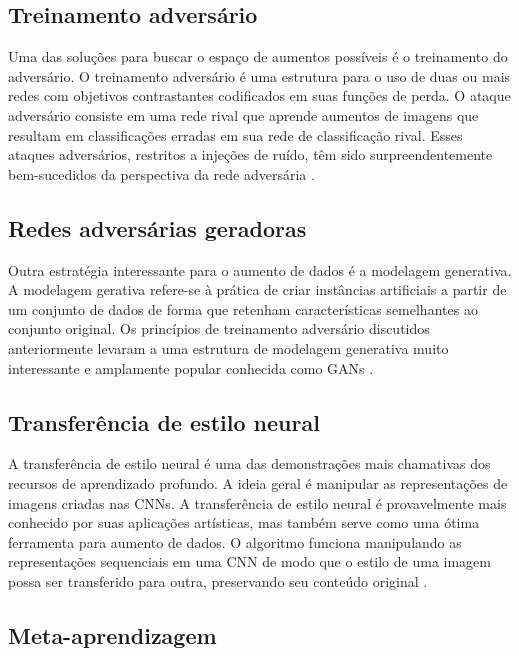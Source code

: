 \documentclass[
	12pt,				%
	oneside,			%
	a4paper,			%
	english,			%
	brazil				%
	]{abntex2ppgsi}
\begin{document}
\subsection{Treinamento adversário}

Uma das soluções para buscar o espaço de aumentos possíveis é o treinamento do adversário. O treinamento adversário é uma estrutura para o uso de duas ou mais redes com objetivos contrastantes codificados em suas funções de perda. O ataque adversário consiste em uma rede rival que aprende aumentos de imagens que resultam em classificações erradas em sua rede de classificação rival. Esses ataques adversários, restritos a injeções de ruído, têm sido surpreendentemente bem-sucedidos da perspectiva da rede adversária \cite{shorten2019survey}.

\subsection{Redes adversárias geradoras}

Outra estratégia interessante para o aumento de dados é a modelagem generativa. A modelagem gerativa refere-se à prática de criar instâncias artificiais a partir de um conjunto de dados de forma que retenham características semelhantes ao conjunto original. Os princípios de treinamento adversário discutidos anteriormente levaram a uma estrutura de modelagem generativa muito interessante e amplamente popular conhecida como GANs \cite{shorten2019survey}.

\subsection{Transferência de estilo neural}

A transferência de estilo neural é uma das demonstrações mais chamativas dos recursos de aprendizado profundo. A ideia geral é manipular as representações de imagens criadas nas CNNs. A transferência de estilo neural é provavelmente mais conhecido por suas aplicações artísticas, mas também serve como uma ótima ferramenta para aumento de dados. O algoritmo funciona manipulando as representações sequenciais em uma CNN de modo que o estilo de uma imagem possa ser transferido para outra, preservando seu conteúdo original \cite{shorten2019survey}.

\subsection{Meta-aprendizagem}
\end{document}
